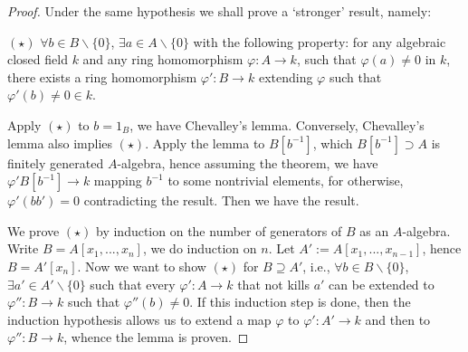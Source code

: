 \documentclass[12pt]{article}
\theoremstyle{definition}
\theoremstyle{plain}
\begin{document}
\begin{proof}
  Under the same hypothesis we shall prove a `stronger' result, namely:
\begin{paragraph}
  {$(\star)$} $\forall b\in B\backslash \{0\}$, $\exists a\in A\backslash\{0\}$ with the following property: for any algebraic closed field $k$ and any ring homomorphism $\varphi:A\to k$, such that $\varphi(a)\neq 0$ in $k$, there exists a ring homomorphism $\varphi':B\to k$ extending $\varphi$ such that $\varphi'(b)\neq 0 \in k$.
\end{paragraph}

\medskip
Apply $(\star)$ to $b=1_B$, we have Chevalley's lemma. Conversely, Chevalley's lemma also implies $(\star)$. Apply the lemma to $B[b^{-1}]$, which $B[b^{-1}]\supset A$ is finitely generated $A$-algebra, hence assuming the theorem, we have $\varphi' B[b^{-1}]\to k$ mapping $b^{-1}$ to some nontrivial elements, for otherwise, $\varphi'(bb')=0$ contradicting the result. Then we have the result.

\medskip
We prove $(\star)$ by induction on the number of generators of $B$ as an $A$-algebra. Write $B=A[x_1, ..., x_n]$, we do induction on $n$. Let $A':=A[x_1, ..., x_{n-1}]$, hence $B=A'[x_n]$. Now we want to show $(\star)$ for $B\supseteq A'$, i.e., $\forall b\in B\backslash\{0\}$, $\exists a'\in A'\backslash\{0\}$ such that every $\varphi':A\to k$ that not kills $a'$ can be extended to $\varphi'': B\to k$ such that $\varphi''(b)\neq 0$. If this induction step is done, then the induction hypothesis allows us to extend a map $\varphi$ to $\varphi':A'\to k$ and then to $\varphi'':B\to k$, whence the lemma is proven.


\end{proof}
\end{document}
